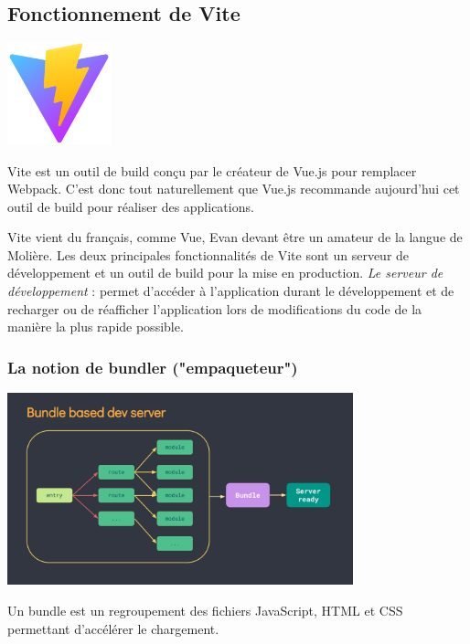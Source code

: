 \subsection{Fonctionnement de Vite}
\begin{center}
\includegraphics[width=3cm]{images/image01.png}
\end{center}

{\color{monOrange}Vite} est un outil de {\color{monOrange}build} conçu par le créateur de {\color{monOrange}Vue.js} pour remplacer {\color{monOrange}Webpack}. C'est donc tout naturellement que {\color{monOrange}Vue.js} recommande aujourd'hui cet outil de {\color{monOrange}build} pour réaliser des applications.

{\color{monOrange}Vite} vient du français, comme {\color{monOrange}Vue, Evan} devant être un amateur de la langue de Molière. Les deux principales fonctionnalités de {\color{monOrange}Vite} sont un serveur de développement et un outil de {\color{monOrange}build} pour la mise en production. {\em Le serveur de développement }: permet d'accéder à l'application durant le développement et de recharger ou de réafficher l'application lors de modifications du code de la manière la plus rapide possible.

\subsubsection{La notion de {\color{monOrange}bundler} ("empaqueteur")}
\begin{center}
\includegraphics[width=10cm]{images/image02.png}
\end{center}
Un {\color{monOrange}bundle} est un regroupement des fichiers {\color{monOrange}JavaScript, HTML} et {\color{monOrange}CSS} permettant d'accélérer le chargement.


